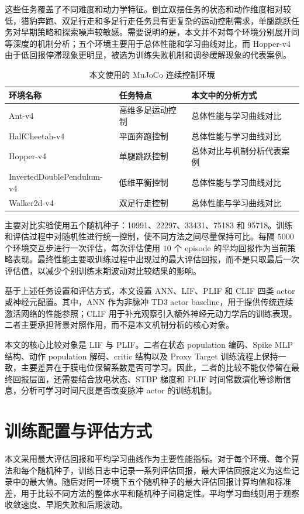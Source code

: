 \documentclass[UTF8,zihao=-4,oneside,openany]{ctexbook}
\begin{document}
这些任务覆盖了不同难度和动力学特征。倒立双摆任务的状态和动作维度相对较低，猎豹奔跑、双足行走和多足行走任务具有更复杂的运动控制需求，单腿跳跃任务对早期策略和探索噪声较敏感。需要说明的是，本文并不对每个环境分别展开同等深度的机制分析；五个环境主要用于总体性能和学习曲线对比，而 Hopper-v4 由于低回报停滞现象更明显，被选为训练失败机制和调参缓解现象的代表案例。

\begin{table}[htbp]
\centering
\caption{本文使用的 MuJoCo 连续控制环境}
\label{tab:envs}
\begin{tabular}{lll}
\toprule
\textbf{环境名称} & \textbf{任务特点} & \textbf{本文中的分析方式} \\
\midrule
Ant-v4 & 高维多足运动控制 & 总体性能与学习曲线对比 \\
HalfCheetah-v4 & 平面奔跑控制 & 总体性能与学习曲线对比 \\
Hopper-v4 & 单腿跳跃控制 & 总体对比与机制分析代表案例 \\
InvertedDoublePendulum-v4 & 低维平衡控制 & 总体性能与学习曲线对比 \\
Walker2d-v4 & 双足行走控制 & 总体性能与学习曲线对比 \\
\bottomrule
\end{tabular}
\end{table}

主要对比实验使用五个随机种子：10991、22297、33431、75183 和 95718。训练和评估过程中对随机性进行统一控制，使不同方法之间尽量保持可比。每隔 $5000$ 个环境交互步进行一次评估，每次评估使用 $10$ 个 episode 的平均回报作为当前策略表现。最终性能主要取训练过程中出现过的最大评估回报，而不是只取最后一次评估值，以减少个别训练末期波动对比较结果的影响。

基于上述任务设置和评估方式，本文设置 ANN、LIF、PLIF 和 CLIF 四类 actor 或神经元配置。其中，ANN 作为非脉冲 TD3 actor baseline，用于提供传统连续激活网络的性能参照；CLIF 用于补充观察引入额外神经元动力学后的训练表现。二者主要承担背景对照作用，而不是本文机制分析的核心对象。

本文的核心比较对象是 LIF 与 PLIF。二者在状态 population 编码、Spike MLP 结构、动作 population 解码、critic 结构以及 Proxy Target 训练流程上保持一致，主要差异在于膜电位保留系数是否可学习。因此，二者的比较不能仅停留在最终回报层面，还需要结合放电状态、STBP 梯度和 PLIF 时间常数演化等诊断信息，分析可学习时间尺度是否改变脉冲 actor 的训练机制。

\section{训练配置与评估方式}
本文采用最大评估回报和平均学习曲线作为主要性能指标。对于每个环境、每个算法和每个随机种子，训练日志中记录一系列评估回报，最大评估回报定义为这些记录中的最大值。随后对同一环境下五个随机种子的最大评估回报计算均值和标准差，用于比较不同方法的整体水平和随机种子间稳定性。平均学习曲线则用于观察收敛速度、早期失败和后期波动。
\end{document}
